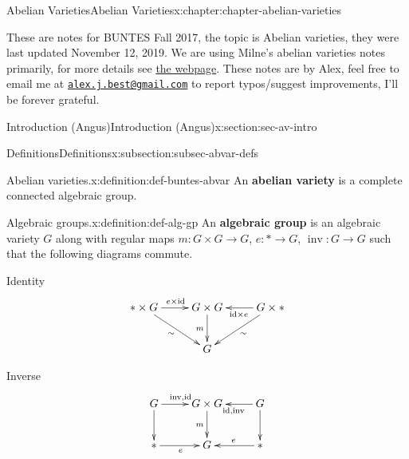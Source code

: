 \documentclass[oneside,10pt,]{book}
\newcommand{\terminology}[1]{\textbf{#1}}
\numberwithin{equation}{section}
\newcommand{\id}{\mathrm{id}}
\begin{document}
\begin{chapterptx}{Abelian Varieties}{}{Abelian Varieties}{}{}{x:chapter:chapter-abelian-varieties}
\begin{introduction}{}%
These are notes for BUNTES Fall 2017, the topic is Abelian varieties, they were last updated November 12, 2019. We are using Milne's abelian varieties notes primarily, for more details see \href{http://math.bu.edu/people/angusmca/buntes/fall2017.html}{the webpage}. These notes are by Alex, feel free to email me at \href{mailto:alex.j.best@gmail.com}{\nolinkurl{alex.j.best@gmail.com}} to report typos\slash{}suggest improvements, I'll be forever grateful.%
\end{introduction}%
%
%
\typeout{************************************************}
\typeout{************************************************}
%
\begin{sectionptx}{Introduction (Angus)}{}{Introduction (Angus)}{}{}{x:section:sec-av-intro}
%
%
\typeout{************************************************}
\typeout{************************************************}
%
\begin{subsectionptx}{Definitions}{}{Definitions}{}{}{x:subsection:subsec-abvar-defs}
\begin{definition}{Abelian varieties.}{x:definition:def-buntes-abvar}%
An \terminology{abelian variety} is a complete connected algebraic group.%
\end{definition}
\begin{definition}{Algebraic groups.}{x:definition:def-alg-gp}%
An \terminology{algebraic group} is an algebraic variety \(G\) along with regular maps \(m\colon G\times G\to G\), \(e \colon * \to G\),  \(\operatorname{inv}\colon G\to G\) such that the following diagrams commute.%
\par
Identity%
\begin{equation*}
\xymatrix{
\ast\times G\ar[dr]_{\sim}\ar[r]^{e\times \id} & G\times G\ar[d]_m &G\times \ast\ar[l]^{\id\times e}\ar[dl]^\sim\\
& G &
}
\end{equation*}
%
\par
Inverse%
\begin{equation*}
\xymatrix{
G\ar[d]\ar[r]^{\operatorname{inv}, \id} & G\times G\ar[d]_m &G\ar[l]^{\id, \operatorname{inv}}\ar[d]\\
\ast\ar[r]_e& G &\ast\ar[l]_e
}
\end{equation*}
%
\par

\end{definition}
\end{subsectionptx}
\end{sectionptx}
\end{chapterptx}
\end{document}
